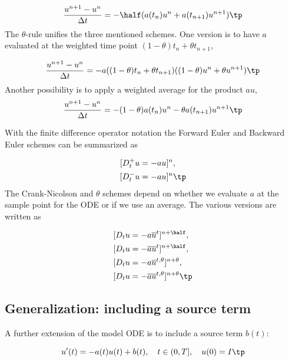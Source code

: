 \documentclass[graybox,sectrefs,envcountresetchap,open=right,final]{svmonodo}
\begin{document}
\begin{equation}
\frac{u^{n+1} - u^{n}}{\Delta t} = -\half(a(t_n)u^n + a(t_{n+1})u^{n+1})
\tp
\end{equation}
The $\theta$-rule unifies the three mentioned schemes. One version is to
have $a$ evaluated at the weighted time point $(1-\theta)t_n + \theta t_{n+1}$,

\begin{equation}
\frac{u^{n+1} - u^{n}}{\Delta t} = -a((1-\theta)t_n + \theta t_{n+1})((1-\theta) u^n + \theta u^{n+1})
\tp
\end{equation}
Another possibility is to apply a weighted average for the product $au$,
\begin{equation}
\frac{u^{n+1} - u^{n}}{\Delta t} = -(1-\theta) a(t_n)u^n - \theta
a(t_{n+1})u^{n+1}
\tp
\end{equation}

With the finite difference operator notation the Forward Euler and Backward
Euler schemes can be summarized as

\begin{align}
\lbrack D^+_t u &= -au\rbrack^n,\\ 
\lbrack D^-_t u &= -au\rbrack^n
\tp
\end{align}
The Crank-Nicolson and $\theta$ schemes depend on whether we evaluate
$a$ at the sample point for the ODE or if we use an average. The
various versions are written as

\begin{align}
\lbrack D_t u &= -a\overline{u}^t\rbrack^{n+\half},\\ 
\lbrack D_t u &= -\overline{au}^t\rbrack^{n+\half},\\ 
\lbrack D_t u &= -a\overline{u}^{t,\theta}\rbrack^{n+\theta},\\ 
\lbrack D_t u &= -\overline{au}^{t,\theta}\rbrack^{n+\theta}
\tp
\end{align}

\subsection{Generalization: including a source term}
\label{decay:source}

A further extension of the model ODE is to include a source term $b(t)$:

\begin{equation}
u^{\prime}(t) = -a(t)u(t) + b(t),\quad t\in (0,T],\quad u(0)=I
\tp
\label{decay:problem:ab}
\end{equation}
\end{document}
